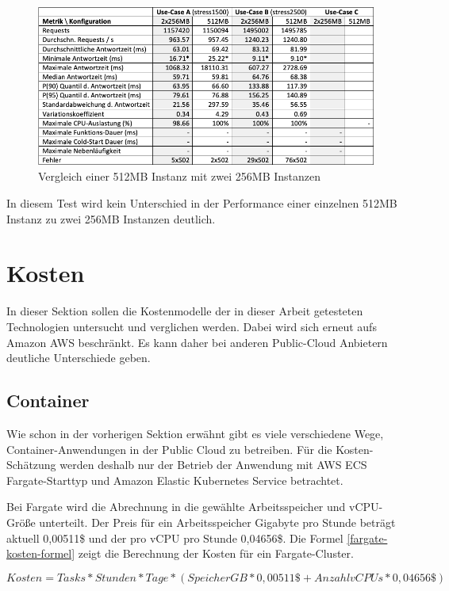 \begin{figure}[H]
    \includegraphics[width=\textwidth]{img/fargate-512-vs-2x256-stress-comparison.png}
    \caption[Vergleich einer 512MB Instanz mit zwei 256MB Instanzen]{Vergleich einer 512MB Instanz mit zwei 256MB Instanzen}
    \label{fig:fargate-512-vs-2x256-stress-comparison}
\end{figure}

In diesem Test wird kein Unterschied in der Performance einer einzelnen 512MB Instanz zu zwei 256MB Instanzen deutlich.


\section{Kosten}
\label{sec:kosten}
In dieser Sektion sollen die Kostenmodelle der in dieser Arbeit getesteten Technologien untersucht und verglichen werden. Dabei wird sich erneut aufs Amazon AWS beschränkt. Es kann daher bei anderen Public-Cloud Anbietern deutliche Unterschiede geben.

\subsection{Container}
Wie schon in der vorherigen Sektion erwähnt gibt es viele verschiedene Wege, Container-Anwendungen in der Public Cloud zu betreiben. Für die Kosten-Schätzung werden deshalb nur der Betrieb der Anwendung mit AWS ECS Fargate-Starttyp und Amazon Elastic Kubernetes Service betrachtet.

Bei Fargate wird die Abrechnung in die gewählte Arbeitsspeicher und vCPU-Größe unterteilt. Der Preis für ein Arbeitsspeicher Gigabyte pro Stunde beträgt aktuell 0,00511\$ und der pro vCPU pro Stunde 0,04656\$. Die Formel \ref{fargate-kosten-formel} zeigt die Berechnung der Kosten für ein Fargate-Cluster.


\begin{equation}
Kosten = Tasks * Stunden * Tage * (SpeicherGB * 0,00511\$ + AnzahlvCPUs * 0,04656\$)
\label{fargate-kosten-formel}
\end{equation}

